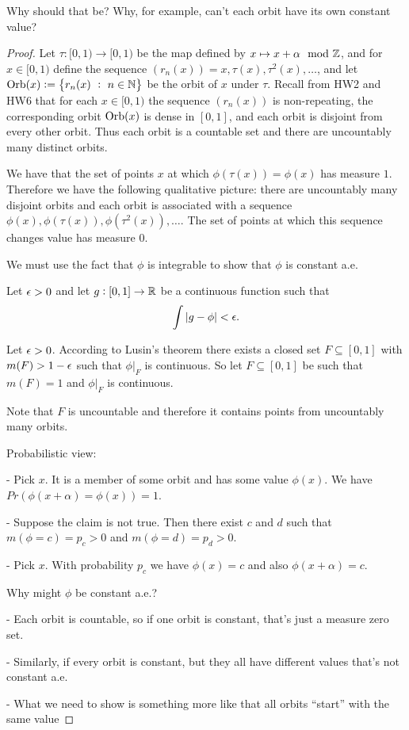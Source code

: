 Why should that be? Why, for example, can't each orbit have its own constant value?


\begin{proof}
  Let $\tau: [0, 1) \to [0, 1)$ be the map defined by $x \mapsto x + \alpha \mod {\mathbb{Z}}$, and for $x \in [0, 1)$
  define the sequence $(r_n(x)) = x, \tau(x), \tau^2(x), \ldots$, and
  let $\text{Orb}(x) := \big\{r_n(x) ~:~ n \in \mathbb{N}\big\}$ be the orbit of $x$ under $\tau$. Recall from HW2 and HW6
  that for each $x \in [0, 1)$ the sequence $(r_n(x))$ is non-repeating, the corresponding orbit $\text{Orb}(x)$ is
  dense in $[0, 1]$, and each orbit is disjoint from every other orbit. Thus each orbit is a countable set and
  there are uncountably many distinct orbits.

  We have that the set of points $x$ at which $\phi(\tau(x)) = \phi(x)$ has measure $1$. Therefore we have the
  following qualitative picture: there are uncountably many disjoint orbits and each orbit is associated with a
  sequence $\phi(x), \phi(\tau(x)), \phi(\tau^2(x)), \ldots$. The set of points at which this sequence changes
  value has measure $0$.

  We must use the fact that $\phi$ is integrable to show that $\phi$ is constant a.e.

  Let $\epsilon > 0$ and let $g: [0, 1] \to \mathbb{R}$ be a continuous function such that
  \begin{align*}
    \int |g - \phi| < \epsilon.
  \end{align*}






  Let $\epsilon > 0$. According to Lusin's theorem there exists a closed set $F \subseteq [0, 1]$
  with $m(F) > 1- \epsilon$ such that $\phi|_F$ is continuous. So let $F \subseteq [0, 1]$ be such that $m(F) = 1$
  and $\phi|_F$ is continuous.

  Note that $F$ is uncountable and therefore it contains points from uncountably many orbits.


  Probabilistic view:

  - Pick $x$. It is a member of some orbit and has some value $\phi(x)$. We have $Pr(\phi(x + \alpha) = \phi(x)) = 1$.

  - Suppose the claim is not true. Then there exist $c$ and $d$ such that $m(\phi = c) = p_c > 0$ and $m(\phi = d) = p_d > 0$.

  - Pick $x$. With probability $p_c$ we have $\phi(x) = c$ and also $\phi(x + \alpha) = c$.










  Why might $\phi$ be constant a.e.?

  - Each orbit is countable, so if one orbit is constant, that's just a measure zero set.

  - Similarly, if every orbit is constant, but they all have different values that's not constant a.e.

  - What we need to show is something more like that all orbits ``start​'' with the same value

\end{proof}


